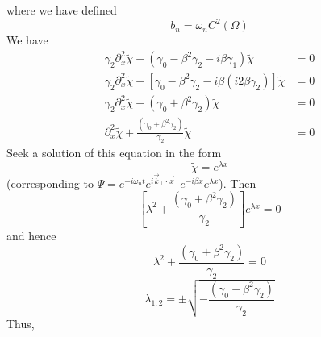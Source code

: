 \documentclass[english]{article}
\begin{document}
 where we have defined 
\[
b_{n}=\omega_{n}C^{2}\left(\Omega\right)
\]
 We have 
\begin{align*}
\gamma_{2}\partial^{2}_{x}\tilde{\chi}+\left(\gamma_{0}-\beta^{2}\gamma_{2}-i\beta\gamma_{1}\right)\tilde{\chi} & =0\\
\gamma_{2}\partial^{2}_{x}\tilde{\chi}+\left[\gamma_{0}-\beta^{2}\gamma_{2}-i\beta\left(i2\beta\gamma_{2}\right)\right]\tilde{\chi} & =0\\
\gamma_{2}\partial^{2}_{x}\tilde{\chi}+\left(\gamma_{0}+\beta^{2}\gamma_{2}\right)\tilde{\chi} & =0\\
\partial^{2}_{x}\tilde{\chi}+\frac{\left(\gamma_{0}+\beta^{2}\gamma_{2}\right)}{\gamma_{2}}\tilde{\chi} & =0
\end{align*}
 Seek a solution of this equation in the form 
\[
\tilde{\chi}=e^{\lambda x}
\]
 (corresponding to $\Psi=e^{-i\omega_{n}t}e^{i\vec{k}_{\bot}\cdot\vec{x}_{\bot}}e^{-i\beta x}e^{\lambda x}$).
Then 
\[
\left[\lambda^{2}+\frac{\left(\gamma_{0}+\beta^{2}\gamma_{2}\right)}{\gamma_{2}}\right]e^{\lambda x}=0
\]
 and hence 
\[
\lambda^{2}+\frac{\left(\gamma_{0}+\beta^{2}\gamma_{2}\right)}{\gamma_{2}}=0
\]
 {}
\[
\lambda_{1,2}=\pm\sqrt{-\frac{\left(\gamma_{0}+\beta^{2}\gamma_{2}\right)}{\gamma_{2}}}
\]
 Thus, 
\end{document}
